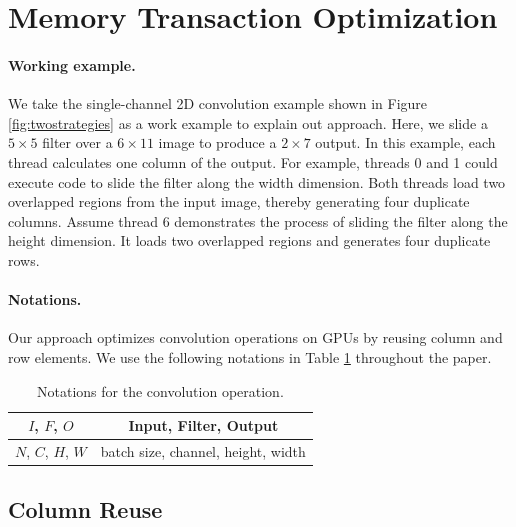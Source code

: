\section{Memory Transaction Optimization}
\label{sec:strategies}

\paragraph{Working example.} We take the single-channel 2D convolution example shown in Figure \ref{fig:twostrategies} as a work example to explain out approach. Here, we slide a $5
\times 5$ filter over a $6 \times 11$ image to produce a $2 \times 7$ output. In this example, each thread calculates one column of the
output. For example, threads 0 and 1 could execute code to slide the filter along the width dimension. Both threads load two overlapped
regions from the input image, thereby generating four duplicate columns. Assume thread 6 demonstrates the process of sliding the filter
along the height dimension. It loads two overlapped regions and generates four duplicate rows.

\paragraph{Notations.} Our approach optimizes convolution operations on GPUs by reusing column and row elements. We use the following notations in Table
\ref{tab:notations} throughout the paper.

\begin{table}[t!]
\centering
\caption{Notations for the convolution operation.}
	\begin{tabular}{c|c}
	\hline
		$I$, $F$, $O$ & Input, Filter, Output \\
		\hline
		$N$, $C$, $H$, $W$ & batch size, channel, height, width\\
		\hline
	\end{tabular}
	\label{tab:notations}
\end{table}

\subsection{Column Reuse}
\label{sec:creuse}

